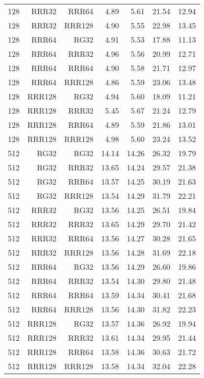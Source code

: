 \begin{table}
\begin{tabular}{|r|r|r|r|r|r|r|}
128 & RRR32 & RRR64 & 4.89 & 5.61 & 21.54 & 12.94 \\
128 & RRR32 & RRR128 & 4.90 & 5.55 & 22.98 & 13.45 \\
128 & RRR64 & RG32 & 4.91 & 5.53 & 17.88 & 11.13 \\
128 & RRR64 & RRR32 & 4.96 & 5.56 & 20.99 & 12.71 \\
128 & RRR64 & RRR64 & 4.90 & 5.58 & 21.71 & 12.97 \\
128 & RRR64 & RRR128 & 4.86 & 5.59 & 23.06 & 13.48 \\
128 & RRR128 & RG32 & 4.94 & 5.60 & 18.09 & 11.21 \\
128 & RRR128 & RRR32 & 5.45 & 5.67 & 21.24 & 12.79 \\
128 & RRR128 & RRR64 & 4.89 & 5.59 & 21.86 & 13.01 \\
128 & RRR128 & RRR128 & 4.98 & 5.60 & 23.24 & 13.52 \\
512 & RG32 & RG32 & 14.14 & 14.26 & 26.32 & 19.79 \\
512 & RG32 & RRR32 & 13.65 & 14.24 & 29.57 & 21.38 \\
512 & RG32 & RRR64 & 13.57 & 14.25 & 30.19 & 21.63 \\
512 & RG32 & RRR128 & 13.54 & 14.29 & 31.79 & 22.21 \\
512 & RRR32 & RG32 & 13.56 & 14.25 & 26.51 & 19.84 \\
512 & RRR32 & RRR32 & 13.65 & 14.29 & 29.70 & 21.42 \\
512 & RRR32 & RRR64 & 13.56 & 14.27 & 30.28 & 21.65 \\
512 & RRR32 & RRR128 & 13.56 & 14.28 & 31.69 & 22.18 \\
512 & RRR64 & RG32 & 13.56 & 14.29 & 26.60 & 19.86 \\
512 & RRR64 & RRR32 & 13.54 & 14.30 & 29.80 & 21.48 \\
512 & RRR64 & RRR64 & 13.59 & 14.34 & 30.41 & 21.68 \\
512 & RRR64 & RRR128 & 13.56 & 14.30 & 31.82 & 22.23 \\
512 & RRR128 & RG32 & 13.57 & 14.36 & 26.92 & 19.94 \\
512 & RRR128 & RRR32 & 13.61 & 14.34 & 29.95 & 21.44 \\
512 & RRR128 & RRR64 & 13.58 & 14.36 & 30.63 & 21.72 \\
512 & RRR128 & RRR128 & 13.58 & 14.34 & 32.04 & 22.28 \\
\hline
\end{tabular}
\end{table}

